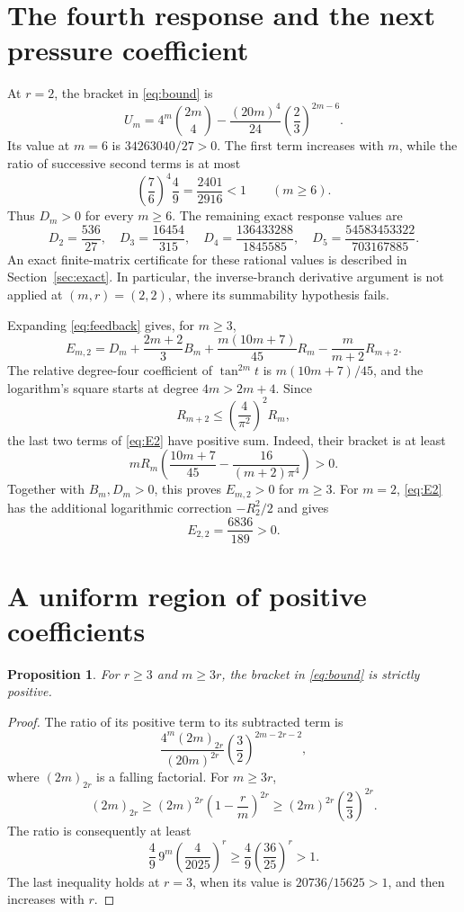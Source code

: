 \documentclass[11pt,a4paper]{article}
\newtheorem{proposition}[theorem]{Proposition}
\theoremstyle{remark}\newtheorem*{ednote}{Editorial note (ProveIt, 2026-10-01)}
\begin{document}
\section{The fourth response and the next pressure coefficient}
At $r=2$, the bracket in \eqref{eq:bound} is
\[
 U_m=4^m\binom{2m}{4}
       -\frac{(20m)^4}{24}\left(\frac23\right)^{2m-6}.
\]
Its value at $m=6$ is $34263040/27>0$. The first term increases with $m$, while the ratio of successive second terms is at most
\[
 \left(\frac76\right)^4\frac49=\frac{2401}{2916}<1
 \qquad(m\ge6).
\]
Thus $D_m>0$ for every $m\ge6$. The remaining exact response values are
\begin{equation}\label{eq:Dsmall}
 D_2=\frac{536}{27},\quad
 D_3=\frac{16454}{315},\quad
 D_4=\frac{136433288}{1845585},\quad
 D_5=\frac{54583453322}{703167885}.
\end{equation}
An exact finite-matrix certificate for these rational values is described in Section~\ref{sec:exact}. In particular, the inverse-branch derivative argument is not applied at $(m,r)=(2,2)$, where its summability hypothesis fails.

Expanding \eqref{eq:feedback} gives, for $m\ge3$,
\begin{equation}\label{eq:E2}
 E_{m,2}=D_m+\frac{2m+2}{3}B_m
 +\frac{m(10m+7)}{45}R_m-\frac{m}{m+2}R_{m+2}.
\end{equation}
The relative degree-four coefficient of $\tan^{2m}t$ is $m(10m+7)/45$, and the logarithm's square starts at degree $4m>2m+4$. Since
\[
 R_{m+2}\le\left(\frac4{\pi^2}\right)^2R_m,
\]
the last two terms of \eqref{eq:E2} have positive sum. Indeed, their bracket is at least
\[
 mR_m\left(\frac{10m+7}{45}
                  -\frac{16}{(m+2)\pi^4}\right)>0.
\]
Together with $B_m,D_m>0$, this proves $E_{m,2}>0$ for $m\ge3$. For $m=2$, \eqref{eq:E2} has the additional logarithmic correction $-R_2^2/2$ and gives
\[
 E_{2,2}=\frac{6836}{189}>0.
\]

\section{A uniform region of positive coefficients}
\begin{proposition}\label{prop:cone}
For $r\ge3$ and $m\ge3r$, the bracket in \eqref{eq:bound} is strictly positive.
\end{proposition}
\begin{proof}
The ratio of its positive term to its subtracted term is
\[
 \frac{4^m(2m)_{2r}}{(20m)^{2r}}
           \left(\frac32\right)^{2m-2r-2},
\]
where $(2m)_{2r}$ is a falling factorial. For $m\ge3r$,
\[
 (2m)_{2r}\ge(2m)^{2r}\left(1-\frac rm\right)^{2r}
           \ge(2m)^{2r}\left(\frac23\right)^{2r}.
\]
The ratio is consequently at least
\[
 \frac49\,9^m\left(\frac4{2025}\right)^r
 \ge\frac49\left(\frac{36}{25}\right)^r>1.
\]
The last inequality holds at $r=3$, when its value is $20736/15625>1$, and then increases with $r$.
\end{proof}
\end{document}
